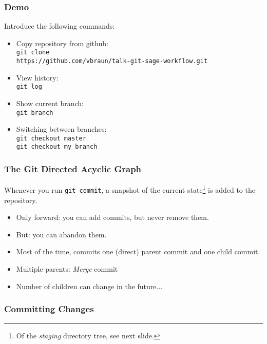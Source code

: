 \begin{frame}
  \frametitle{Demo}
  
  Introduce the following commands:
  \begin{itemize}
  \item 
    Copy repository from github:\\
    \texttt{git clone}
    \\\hfill
    \texttt{https://github.com/vbraun/talk-git-sage-workflow.git}
  \item View history:\\
    \texttt{git log}
  \item Show current branch:\\
    \texttt{git branch}
  \item Switching between branches:\\
    \texttt{git checkout master}\\\texttt{git checkout my\_branch}
  \end{itemize}
\end{frame}


\begin{frame}
  \frametitle{The Git Directed Acyclic Graph}

  Whenever you run \texttt{git commit}, a snapshot of the current
  state\footnote{Of the \emph{staging} directory tree, see next
    slide.} is added to the repository.
  \begin{itemize}
  \item Only forward: you can add commits, but never remove them.
  \item But: you can abandon them.
  \item Most of the time, commits one (direct) parent commit and one
    child commit.
  \item Multiple parents: \emph{Merge} commit
  \item Number of children can change in the future...
  \end{itemize}
\end{frame}


\begin{frame}
  \frametitle{Committing Changes}

  
\end{frame}




